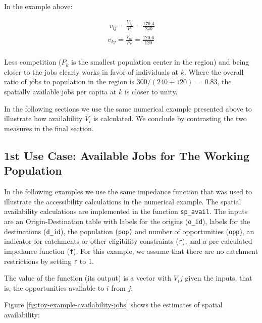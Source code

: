 \documentclass[]{elsarticle} %
\begin{document}
In the example above:

\[
\begin{array}{l}\
v_{ij} = \frac{V_{ij}}{P_i} =  \frac{179.4}{240}\\
v_{kj} =  \frac{V_{ik}}{P_k} =  \frac{120.6}{120}\\
\end{array}
\]

Less competition (\(P_k\) is the smallest population center in the
region) and being closer to the jobs clearly works in favor of
individuals at \(k\). Where the overall ratio of jobs to population in
the region is \(300/(240 + 120)=\) 0.83, the spatially available jobs
per capita at \(k\) is closer to unity.

In the following sections we use the same numerical example presented
above to illustrate how availability \(V_i\) is calculated. We conclude
by contrasting the two measures in the final section.

\hypertarget{st-use-case-available-jobs-for-the-working-population}{%
\subsection{1st Use Case: Available Jobs for The Working
Population}\label{st-use-case-available-jobs-for-the-working-population}}

In the following examples we use the same impedance function that was
used to illustrate the accessibility calculations in the numerical
example. The spatial availability calculations are implemented in the
function \texttt{sp\_avail}. The inputs are an Origin-Destination table
with labels for the origins (\texttt{o\_id}), labels for the
destinations (\texttt{d\_id}), the population (\texttt{pop)} and number
of opportunities (\texttt{opp}), an indicator for catchments or other
eligibility constraints (\texttt{r}), and a pre-calculated impedance
function (\texttt{f}). For this example, we assume that there are no
catchment restrictions by setting \texttt{r} to 1.

The value of the function (its output) is a vector with \(V_ij\) given
the inputs, that is, the opportunities available to \(i\) from \(j\):

Figure \ref{fig:toy-example-availability-jobs} shows the estimates of
spatial availability:
\end{document}
